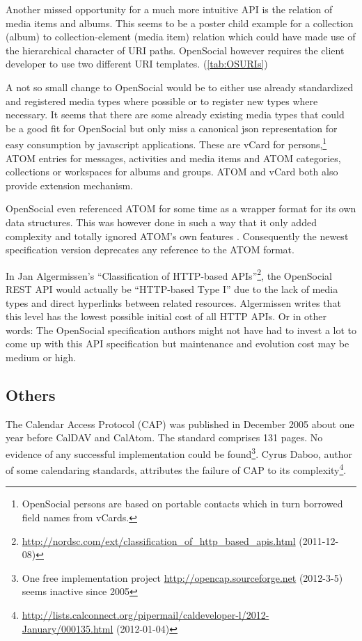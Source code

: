 \documentclass[11pt,a4paper,headsepline,twoside]{scrartcl}		%
\newcommand{\citeurl}[2]{\url{#1} (#2)}
\begin{document}
Another missed opportunity for a much more intuitive API is the relation of
media items and albums. This seems to be a poster child example for a collection
(album) to collection-element (media item) relation which could have made use of
the hierarchical character of URI paths. OpenSocial however requires the client
developer to use two different URI templates. (\autoref{tab:OSURIs})

A not so small change to OpenSocial would be to either use already standardized
and registered media types where possible or to register new types where
necessary. It seems that there are some already existing media types that could
be a good fit for OpenSocial but only miss a canonical json representation for
easy consumption by javascript applications. These are vCard for
persons,\footnote{OpenSocial persons are based on portable contacts which in
  turn borrowed field names from vCards.} ATOM entries \cite{RFC4287} for
messages, activities and media items and ATOM categories, collections or
workspaces \cite{RFC5023} for albums and groups. ATOM and vCard both also provide
extension mechanism.
  
OpenSocial even referenced ATOM for some time as a wrapper format for its own
data structures. This was however done in such a way that it only added
complexity and totally ignored ATOM's own
features \cite{dehora2009}. Consequently the newest specification version
deprecates any reference to the ATOM format.

In Jan Algermissen's ``Classification of HTTP-based
APIs''\footnote{\citeurl{http://nordsc.com/ext/classification_of_http_based_apis.html}{2011-12-08}},
the OpenSocial REST API would actually be ``HTTP-based Type I'' due to the lack
of media types and direct hyperlinks between related resources. Algermissen
writes that this level has the lowest possible initial cost of all HTTP APIs. Or
in other words: The OpenSocial specification authors might not have had to
invest a lot to come up with this API specification but maintenance and
evolution cost may be medium or high.

\subsection{Others}

The Calendar Access Protocol (CAP) \cite{RFC4324} was published in December 2005
about one year before CalDAV and CalAtom. The standard comprises 131 pages. No
evidence of any successful implementation could be found\footnote{One free
  implementation project \citeurl{http://opencap.sourceforge.net}{2012-3-5}
  seems inactive since 2005}. Cyrus Daboo, author of some calendaring standards,
attributes the failure of CAP to its
complexity\footnote{\citeurl{http://lists.calconnect.org/pipermail/caldeveloper-l/2012-January/000135.html}{2012-01-04}}.
\end{document}
